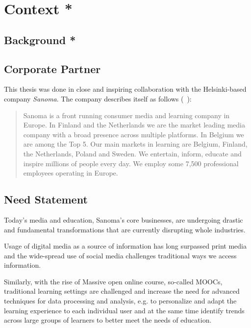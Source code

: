 
\clearpage
\section{Context *}

\subsection{Background *}



\subsection{Corporate Partner}

This thesis was done in close and inspiring collaboration with the Helsinki-based company \emph{Sanoma}. The company describes itself as follows (~\cite{sanoma-about}):

\blockquote{Sanoma is a front running consumer media and learning company in Europe. In Finland and the Netherlands we are the market leading media company with a broad presence across multiple platforms. In Belgium we are among the Top 5. Our main markets in learning are Belgium, Finland, the Netherlands, Poland and Sweden. We entertain, inform, educate and inspire millions of people every day. We employ some 7,500 professional employees operating in Europe.}

\subsection{Need Statement}

Today's media and education, Sanoma's core businesses, are undergoing drastic and fundamental transformations that are currently disrupting whole industries. 

Usage of digital media as a source of information has long surpassed print media  and the wide-spread use of social media challenges traditional ways we access information. 

Similarly, with the rise of Massive open online course, so-called MOOCs, traditional learning settings are challenged and increase the need for advanced techniques for data processing and analysis, e.g. to personalize and adapt the learning experience to each individual user and at the same time identify trends across large groups of learners to better meet the needs of education.

